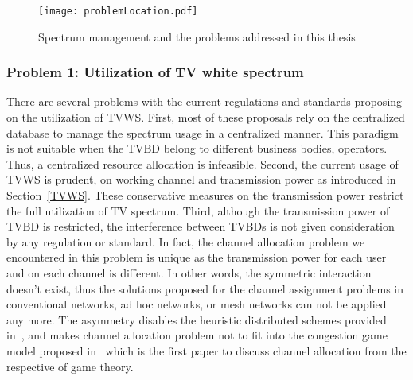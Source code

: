 \begin{figure}[h!]
  \centering
  \texttt{[image: problemLocation.pdf]}
  \caption{Spectrum management and the problems addressed in this thesis}
\label{problemLocation}
\end{figure}

\subsubsection{Problem 1: Utilization of TV white spectrum}



There are several problems with the current regulations and standards proposing on the utilization of TVWS.
First, most of these proposals rely on the centralized database to manage the spectrum usage in a centralized manner.
This paradigm is not suitable when the TVBD belong to different business bodies, \ie operators.
Thus, a centralized resource allocation is infeasible.
Second, the current usage of TVWS is prudent, \ie on working channel and transmission power as introduced in Section~\ref{TVWS}.
These conservative measures on the transmission power restrict the full utilization of TV spectrum.
Third, although the transmission power of TVBD is restricted, the interference between TVBDs is not given consideration by any regulation or standard.
In fact, the channel allocation problem we encountered in this problem is unique as the transmission power for each user and on each channel is different.
In other words, the symmetric interaction doesn't exist, thus the solutions proposed for the channel assignment problems in conventional networks, \eg ad hoc networks, or mesh networks can not be applied any more.
The asymmetry disables the heuristic distributed schemes provided in~\cite{Ko_DistributedCA}, and makes channel allocation problem not to fit into the congestion game model proposed in~\cite{allerton08_liu} which is the first paper to discuss channel allocation from the respective of game theory.

